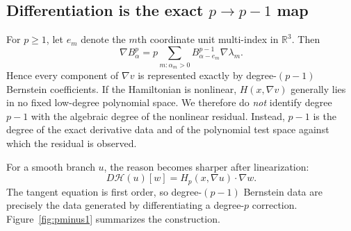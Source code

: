 \documentclass[preprint,12pt]{elsarticle}
\newcommand{\Rn}{\mathbb R}
\newcommand{\grad}{\nabla}
\begin{document}
\subsection{Differentiation is the exact $p\to p-1$ map}
For $p\ge1$, let $e_m$ denote the $m$th coordinate unit multi-index in $\Rn^3$.  Then
\begin{equation}\label{eq:bern-deriv}
 \grad B^p_\alpha
 =p\sum_{m:\alpha_m>0}B^{p-1}_{\alpha-e_m}\grad\lambda_m.
\end{equation}
Hence every component of $\grad v$ is represented exactly by degree-$(p-1)$ Bernstein coefficients.  If the Hamiltonian is nonlinear, $H(x,\grad v)$ generally lies in no fixed low-degree polynomial space.  We therefore do \emph{not} identify degree $p-1$ with the algebraic degree of the nonlinear residual.  Instead, $p-1$ is the degree of the exact derivative data and of the polynomial test space against which the residual is observed.

For a smooth branch $u$, the reason becomes sharper after linearization:
\begin{equation}\label{eq:HJlin-preview}
 D\mathcal H(u)[w]=H_p(x,\grad u)\cdot\grad w.
\end{equation}
The tangent equation is first order, so degree-$(p-1)$ Bernstein data are precisely the data generated by differentiating a degree-$p$ correction.  Figure~\ref{fig:pminus1} summarizes the construction.
\end{document}
